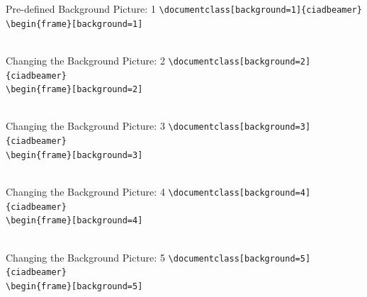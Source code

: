 \documentclass[english,sectioncirclenumberstyle]{ciadbeamer}
\begin{document}
\begin{frame}[t]{{Pre-defined Background Picture:} 1}
	\texttt{{\textbackslash}documentclass[background=1]\{ciadbeamer\}} \\[.25cm]
	\texttt{{\textbackslash}begin\{frame\}[background=1]} \\[.25cm]
	\centering{} \\[.25cm]
\end{frame}

\begin{frame}[t]{{Changing the Background Picture:} 2}
	\texttt{{\textbackslash}documentclass[background=2]\{ciadbeamer\}} \\[.25cm]
	\texttt{{\textbackslash}begin\{frame\}[background=2]} \\[.25cm]
	\centering{} \\[.25cm]
\end{frame}

\begin{frame}[t]{{Changing the Background Picture:} 3}
	\texttt{{\textbackslash}documentclass[background=3]\{ciadbeamer\}} \\[.25cm]
	\texttt{{\textbackslash}begin\{frame\}[background=3]} \\[.25cm]
	\centering{} \\[.25cm]
\end{frame}

\begin{frame}[t]{{Changing the Background Picture:} 4}
	\texttt{{\textbackslash}documentclass[background=4]\{ciadbeamer\}} \\[.25cm]
	\texttt{{\textbackslash}begin\{frame\}[background=4]} \\[.25cm]
	\centering{} \\[.25cm]
\end{frame}

\begin{frame}[t]{{Changing the Background Picture:} 5}
	\texttt{{\textbackslash}documentclass[background=5]\{ciadbeamer\}} \\[.25cm]
	\texttt{{\textbackslash}begin\{frame\}[background=5]} \\[.25cm]
	\centering{} \\[.25cm]
\end{frame}
\end{document}
